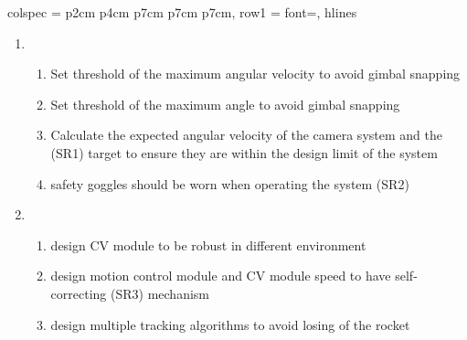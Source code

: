 \documentclass{article}
\begin{document}
\begin{table}[htbp]
{\begin{tblr}{
        colspec = {p{2cm} p{4cm} p{7cm} p{7cm} p{7cm}},
        row{1} = {font=\bfseries},
        hlines
      }
\begin{enumerate}
\begin{enumerate}
                \item careful handling in transportation and assembly to avoid damage to the
                      components
                \item Integration test before launch to ensure proper communication between all
                      modules
              \end{enumerate}
        \item \begin{enumerate}
                \item Set threshold of the maximum angular velocity to avoid gimbal snapping
                \item Set threshold of the maximum angle to avoid gimbal snapping
                \item Calculate the expected angular velocity of the camera system and the (SR1)
                      target to ensure they are within the design limit of the system
                \item safety goggles should be worn when operating the system (SR2)
              \end{enumerate}
        \item \begin{enumerate}
                \item design CV module to be robust in different environment
                \item design motion control module and CV module speed to have self-correcting (SR3)
                      mechanism
                \item design multiple tracking algorithms to avoid losing of the rocket


\end{enumerate}
\end{enumerate}
\end{tblr}}
\end{table}
\end{document}
